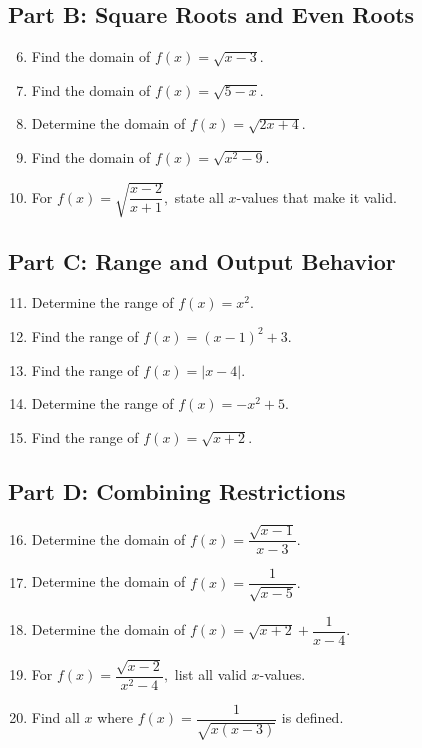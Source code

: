 \documentclass[14pt]{extarticle}
\begin{document}
\subsection*{Part B: Square Roots and Even Roots}
\begin{enumerate}
  \setcounter{enumi}{5}
  \item Find the domain of \(f(x) = \sqrt{x - 3}.\)
  \item Find the domain of \(f(x) = \sqrt{5 - x}.\)
  \item Determine the domain of \(f(x) = \sqrt{2x + 4}.\)
  \item Find the domain of \(f(x) = \sqrt{x^2 - 9}.\)
  \item For \(f(x) = \sqrt{\dfrac{x - 2}{x + 1}},\) state all \(x\)-values that make it valid.
\end{enumerate}

\subsection*{Part C: Range and Output Behavior}
\begin{enumerate}
  \setcounter{enumi}{10}
  \item Determine the range of \(f(x) = x^2.\)
  \item Find the range of \(f(x) = (x - 1)^2 + 3.\)
  \item Find the range of \(f(x) = |x - 4|.\)
  \item Determine the range of \(f(x) = -x^2 + 5.\)
  \item Find the range of \(f(x) = \sqrt{x + 2}.\)
\end{enumerate}

\subsection*{Part D: Combining Restrictions}
\begin{enumerate}
  \setcounter{enumi}{15}
  \item Determine the domain of \(f(x) = \dfrac{\sqrt{x - 1}}{x - 3}.\)
  \item Determine the domain of \(f(x) = \dfrac{1}{\sqrt{x - 5}}.\)
  \item Determine the domain of \(f(x) = \sqrt{x + 2} + \dfrac{1}{x - 4}.\)
  \item For \(f(x) = \dfrac{\sqrt{x - 2}}{x^2 - 4},\) list all valid \(x\)-values.
  \item Find all \(x\) where \(f(x) = \dfrac{1}{\sqrt{x(x - 3)}}\) is defined.
\end{enumerate}
\end{document}
